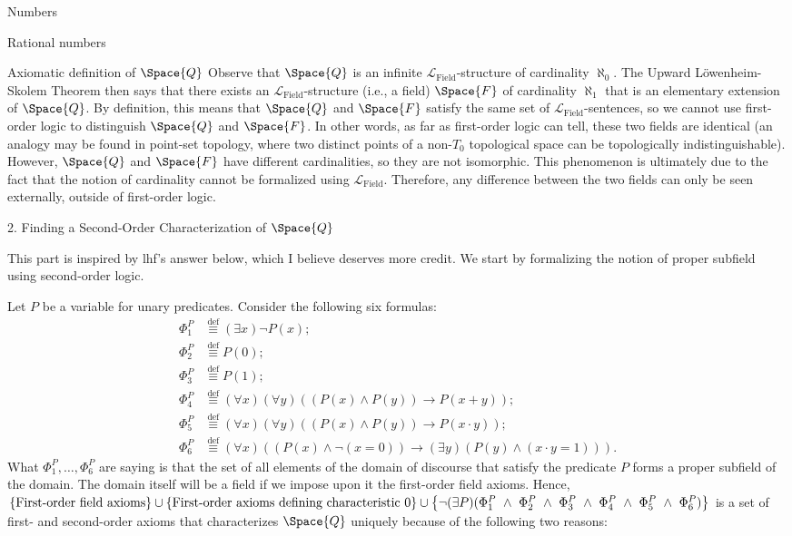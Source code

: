 \begin{plSection}{Numbers}
\begin{plSection}{Rational numbers}
\begin{plSection}{Axiomatic definition of \texorpdfstring{$\Space{Q}$}{Q}}
Observe that $ \Space{Q} $ is an infinite 
$ \mathcal{L}_{\text{Field}} $-structure 
of cardinality $ \aleph_{0} $. 
The Upward L\"{o}wenheim-Skolem Theorem then says that 
there exists an $ \mathcal{L}_{\text{Field}} $-structure 
(i.e., a field) $ \Space{F} $ of cardinality $ \aleph_{1} $ 
that is an elementary extension of $ \Space{Q} $. 
By definition, this means that $ \Space{Q} $ and $ \Space{F} $ 
satisfy the same set of $ \mathcal{L}_{\text{Field}} $-sentences, 
so we cannot use first-order logic to distinguish $ \Space{Q} $ 
and $ \Space{F} $. In other words, as far as first-order logic 
can tell, these two fields are identical
(an analogy may be found in point-set topology,
where two distinct points of a non-$ T_{0} $ topological space 
can be topologically indistinguishable). 
However, $ \Space{Q} $ and $ \Space{F} $ have different 
cardinalities, so they are not isomorphic. 
This phenomenon is ultimately due to the fact 
that the notion of cardinality cannot be formalized
 using $ \mathcal{L}_{\text{Field}} $. 
 Therefore, any difference between the two fields 
 can only be seen externally, outside of first-order logic.

2. Finding a Second-Order Characterization of $ \Space{Q} $

This part is inspired by lhf's answer below, 
which I believe deserves more credit. 
We start by formalizing the notion of proper subfield 
using second-order logic.

Let $ P $ be a variable for unary predicates. 
Consider the following six formulas: 
\begin{align} 
\Phi^{P}_{1} &\stackrel{\text{def}}{\equiv} 
(\exists x) \neg P(x); 
\\ \Phi^{P}_{2} &\stackrel{\text{def}}{\equiv} P(0); 
\\ \Phi^{P}_{3} &\stackrel{\text{def}}{\equiv} P(1); 
\\ \Phi^{P}_{4} &\stackrel{\text{def}}{\equiv} 
(\forall x)(\forall y)((P(x) \land P(y)) 
\rightarrow P(x + y)); \\ \Phi^{P}_{5} 
&\stackrel{\text{def}}{\equiv} 
(\forall x)(\forall y)
((P(x) 
\land P(y)) \rightarrow P(x \cdot y));
\\ \Phi^{P}_{6} 
&\stackrel{\text{def}}{\equiv} 
(\forall x)((P(x) \land \neg (x = 0)) \rightarrow
(\exists y)(P(y) \land (x \cdot y = 1))). 
\end{align} 
What $ \Phi^{P}_{1},\ldots,\Phi^{P}_{6} $ are saying is that 
the set of all elements of the domain of discourse 
that satisfy the predicate $ P $ 
forms a proper subfield of the domain. 
The domain itself will be a field 
if we impose upon it the first-order field axioms. 
Hence, 
$ \left\{ \text{First-order field axioms} \right\} 
\cup 
\left\{ \text{First-order axioms defining characteristic $ 0 $} \right\}
 \cup
\left\{ \neg (\exists P)(\Phi^{P}_{1} 
~ \land ~ \Phi^{P}_{2} ~ \land ~ 
\Phi^{P}_{3} ~ \land ~ 
\Phi^{P}_{4} ~ \land ~ 
\Phi^{P}_{5} ~ \land ~ \Phi^{P}_{6}) \right\} $
is a set of first- and second-order axioms that characterizes
$ \Space{Q} $ uniquely because of the following two reasons:


\end{plSection}
\end{plSection}
\end{plSection}
